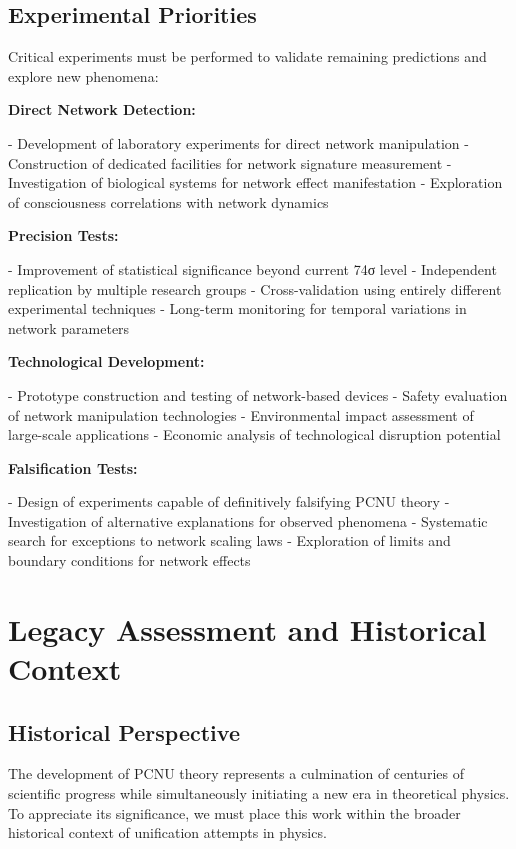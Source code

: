\documentclass[11pt,a4paper]{article}
\begin{document}
\subsection{Experimental Priorities}

Critical experiments must be performed to validate remaining predictions and explore new phenomena:

\textbf{Direct Network Detection:}

- Development of laboratory experiments for direct network manipulation
- Construction of dedicated facilities for network signature measurement
- Investigation of biological systems for network effect manifestation
- Exploration of consciousness correlations with network dynamics

\textbf{Precision Tests:}

- Improvement of statistical significance beyond current 74σ level
- Independent replication by multiple research groups
- Cross-validation using entirely different experimental techniques
- Long-term monitoring for temporal variations in network parameters

\textbf{Technological Development:}

- Prototype construction and testing of network-based devices
- Safety evaluation of network manipulation technologies
- Environmental impact assessment of large-scale applications
- Economic analysis of technological disruption potential

\textbf{Falsification Tests:}

- Design of experiments capable of definitively falsifying PCNU theory
- Investigation of alternative explanations for observed phenomena
- Systematic search for exceptions to network scaling laws
- Exploration of limits and boundary conditions for network effects

\section{Legacy Assessment and Historical Context}

\subsection{Historical Perspective}

The development of PCNU theory represents a culmination of centuries of scientific progress while simultaneously initiating a new era in theoretical physics. To appreciate its significance, we must place this work within the broader historical context of unification attempts in physics.
\end{document}
